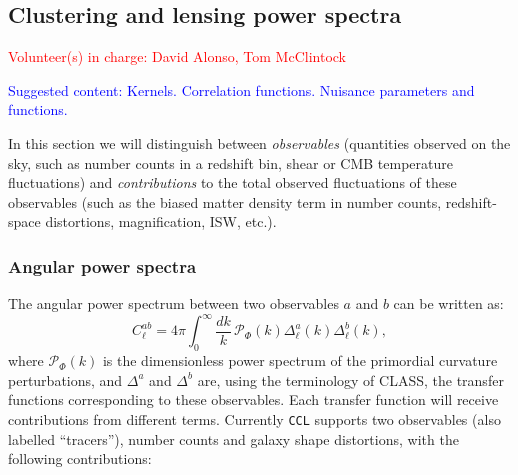 \documentclass[\docopts]{\docclass}
\newcommand{\vol}[1]{\textcolor{red}{Volunteer(s) in charge: #1}}
\newcommand{\cont}[1]{\textcolor{blue}{Suggested content: #1}}
\newcommand{\ccl}{{\tt CCL}\xspace}
\begin{document}
\subsection{Clustering and lensing power spectra}
\vol{David Alonso, Tom McClintock}

\cont{Kernels. Correlation functions. Nuisance parameters and functions.}

In this section we will distinguish between {\sl observables} (quantities observed on the sky, such as number counts in a redshift bin, shear or CMB temperature fluctuations) and {\sl contributions} to the total observed fluctuations of these observables (such as the biased matter density term in number counts, redshift-space distortions, magnification, ISW, etc.).

\subsubsection{Angular power spectra}

The angular power spectrum between two observables $a$ and $b$ can be written as:
\begin{equation}
 C^{ab}_\ell=4\pi\int_0^\infty \frac{dk}{k}\,\mathcal{P}_\Phi(k)\Delta^a_\ell(k)\Delta^b_\ell(k),
\end{equation}
where $\mathcal{P}_\Phi(k)$ is the dimensionless power spectrum of the primordial curvature perturbations, and $\Delta^a$ and $\Delta^b$ are, using the terminology of CLASS, the transfer functions corresponding to these observables. Each transfer function will receive contributions from different terms. Currently \ccl supports two observables (also labelled ``tracers''), number counts and galaxy shape distortions, with the following contributions:
\end{document}
